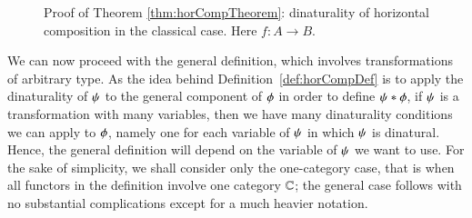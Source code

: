 \begin{sidewaysfigure}[p]
	\caption{Proof of Theorem \ref{thm:horCompTheorem}: dinaturality of horizontal composition in the classical case. Here $f\colon A \to B$.}
	\label{fig:DinaturalityHorizontalCompositionFigure}
\end{sidewaysfigure}

We can now proceed with the general definition, which involves transformations
of arbitrary type. As the idea behind Definition~\ref{def:horCompDef} is to apply
the dinaturality of $\psi$ to the general component of $\fst$ in order to define
$\hc \fst \snd$, if $\psi$ is a transformation with many variables, then we
have many dinaturality conditions we can apply to $\fst$, namely one for each
variable of $\psi$ in which $\psi$ is dinatural. Hence, the general definition
will depend on the variable of $\psi$ we want to use. For the sake of
simplicity, we shall consider only the one-category case, that is when all
functors in the definition involve one category $\mathbb C$; the general case follows with no substantial complications
except for a much heavier notation. 

